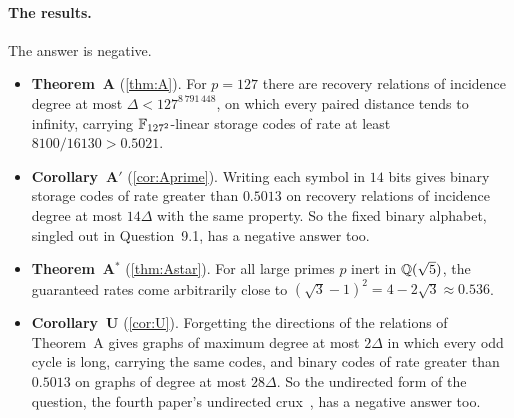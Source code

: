 \paragraph{The results.} The answer is negative.
\begin{itemize}
\item \textbf{Theorem~A} (\cref{thm:A}). For $p=127$ there are recovery relations of incidence degree at most
$\Delta<127^{8\,791\,448}$, on which every paired distance tends to infinity, carrying $\mathbb{F}_{127^2}$-linear storage codes of
rate at least $8100/16130>0.5021$.
\item \textbf{Corollary~A$'$} (\cref{cor:Aprime}). Writing each symbol in $14$ bits gives binary storage codes of rate
greater than $0.5013$ on recovery relations of incidence degree at most $14\Delta$ with the same property. So the fixed
binary alphabet, singled out in Question~9.1, has a negative answer too.
\item \textbf{Theorem~A$^*$} (\cref{thm:Astar}). For all large primes $p$ inert in $\mathbb{Q}(\sqrt5)$, the guaranteed rates come
arbitrarily close to $(\sqrt3-1)^2=4-2\sqrt3\approx0.536$.
\item \textbf{Corollary~U} (\cref{cor:U}). Forgetting the directions of the relations of Theorem~A gives graphs of maximum
degree at most $2\Delta$ in which every odd cycle is long, carrying the same codes, and binary codes of rate greater than
$0.5013$ on graphs of degree at most $28\Delta$. So the undirected form of the question, the fourth paper's undirected
crux~\cite[Question~6.1]{CurvedMotion2026}, has a negative answer too.
\end{itemize}


